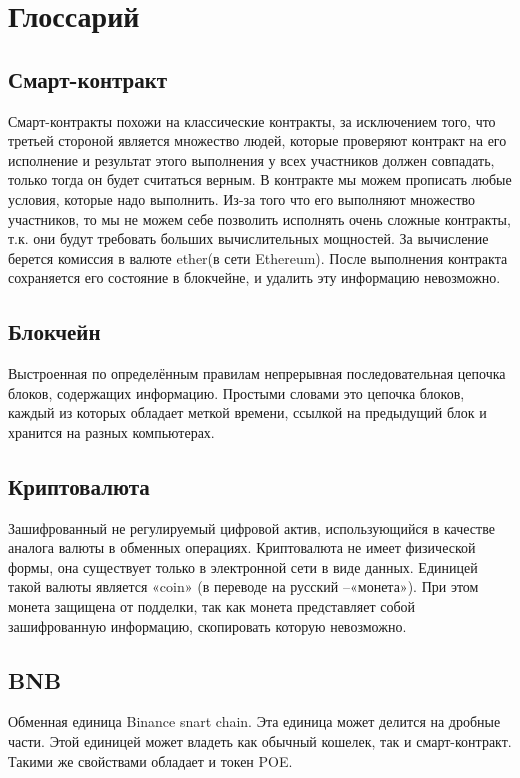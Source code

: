 \documentclass[a4paper,12pt]{report}
\begin{document}
\chapter{Глоссарий}

\section{Смарт-контракт}
Смарт-контракты похожи на классические контракты, за исключением того, что третьей стороной является множество людей, которые проверяют контракт на его исполнение и результат этого выполнения у всех участников должен совпадать, только тогда он будет считаться верным. В контракте мы можем прописать любые условия, которые надо выполнить. Из-за того что его выполняют множество участников, то мы не можем себе позволить исполнять очень сложные контракты, т.к. они будут требовать больших вычислительных мощностей. За вычисление берется комиссия в валюте ether(в сети Ethereum). После выполнения контракта сохраняется его состояние в блокчейне,
и удалить эту информацию невозможно.

\section{Блокчейн}
Выстроенная по определённым правилам непрерывная последовательная цепочка блоков, содержащих информацию. Простыми словами это цепочка блоков, каждый из которых обладает меткой времени, ссылкой на предыдущий блок и хранится на разных компьютерах.

\section{Криптовалюта}
Зашифрованный не регулируемый цифровой актив, использующийся в качестве аналога валюты в обменных операциях. Криптовалюта не имеет физической формы, она существует только в электронной сети в виде данных. Единицей такой валюты является «coin» (в переводе на русский –«монета»). При этом монета защищена от подделки, так как монета представляет собой зашифрованную информацию, скопировать которую невозможно.


\section{BNB}
Обменная единица Binance snart chain. Эта единица может делится на дробные части. Этой единицей может владеть как обычный кошелек, так и смарт-контракт. Такими же свойствами обладает и токен POE.
\end{document}
